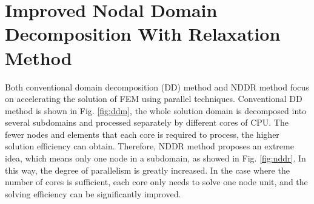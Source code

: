 \documentclass[journal,transmag]{IEEEtran}
\begin{document}
\section{Improved Nodal Domain Decomposition With Relaxation Method}
Both conventional domain decomposition (DD) method and NDDR method focus on accelerating the solution of FEM using parallel techniques. Conventional DD method is shown in Fig. \ref{fig:ddm}, the whole solution domain is decomposed into several subdomains and processed separately by different cores of CPU. The fewer nodes and elements that each core is required to process, the higher solution efficiency can obtain. Therefore, NDDR method proposes an extreme idea, which means only one node in a subdomain, as showed in Fig. \ref{fig:nddr}. In this way, the degree of parallelism is greatly increased. In the case where the number of cores is sufficient, each core only needs to solve one node unit, and the solving efficiency can be significantly improved.
\end{document}
